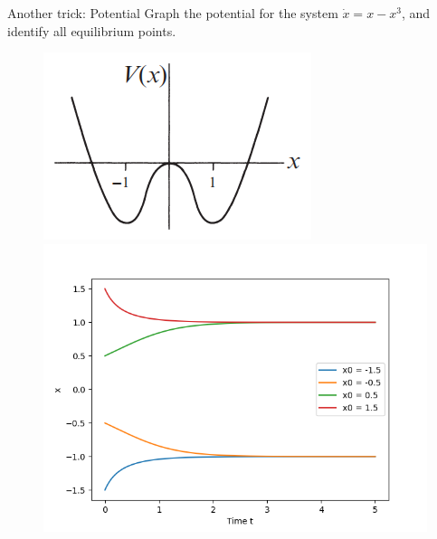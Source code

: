 \documentclass[9pt,aspectratio=43,mathserif,table]{beamer}
\begin{document}
\begin{frame}{Another trick: Potential}
   Graph the potential for the system $\dot x = x - x ^ 3 $, and
   identify all equilibrium points.

    \begin{figure}[!h]
      \centering
      \includegraphics[width=.4\textwidth]{fig/bistable_potential.png}
      \includegraphics[width=.4\textwidth]{fig/bistable_solution.png}
    \end{figure}

\end{frame}
\end{document}
